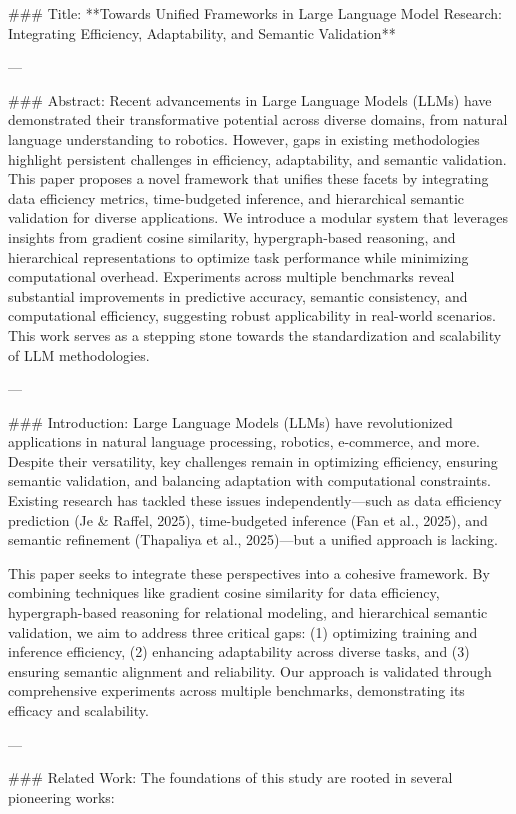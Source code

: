 ### Title:
**Towards Unified Frameworks in Large Language Model Research: Integrating Efficiency, Adaptability, and Semantic Validation**

---

### Abstract:
Recent advancements in Large Language Models (LLMs) have demonstrated their transformative potential across diverse domains, from natural language understanding to robotics. However, gaps in existing methodologies highlight persistent challenges in efficiency, adaptability, and semantic validation. This paper proposes a novel framework that unifies these facets by integrating data efficiency metrics, time-budgeted inference, and hierarchical semantic validation for diverse applications. We introduce a modular system that leverages insights from gradient cosine similarity, hypergraph-based reasoning, and hierarchical representations to optimize task performance while minimizing computational overhead. Experiments across multiple benchmarks reveal substantial improvements in predictive accuracy, semantic consistency, and computational efficiency, suggesting robust applicability in real-world scenarios. This work serves as a stepping stone towards the standardization and scalability of LLM methodologies.

---

### Introduction:
Large Language Models (LLMs) have revolutionized applications in natural language processing, robotics, e-commerce, and more. Despite their versatility, key challenges remain in optimizing efficiency, ensuring semantic validation, and balancing adaptation with computational constraints. Existing research has tackled these issues independently—such as data efficiency prediction (Je & Raffel, 2025), time-budgeted inference (Fan et al., 2025), and semantic refinement (Thapaliya et al., 2025)—but a unified approach is lacking.

This paper seeks to integrate these perspectives into a cohesive framework. By combining techniques like gradient cosine similarity for data efficiency, hypergraph-based reasoning for relational modeling, and hierarchical semantic validation, we aim to address three critical gaps: (1) optimizing training and inference efficiency, (2) enhancing adaptability across diverse tasks, and (3) ensuring semantic alignment and reliability. Our approach is validated through comprehensive experiments across multiple benchmarks, demonstrating its efficacy and scalability.

---

### Related Work:
The foundations of this study are rooted in several pioneering works:

